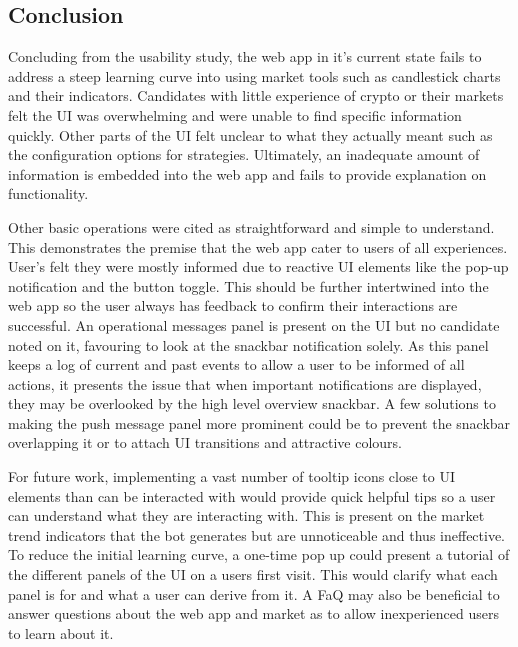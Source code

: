 \subsection{Conclusion}
\label{sec:evaluation:ui:conclusion}
\noindent Concluding from the usability study, the web app in it's current state fails to address a steep learning curve into using market tools such as candlestick charts and their indicators. Candidates with little experience of crypto or their markets felt the UI was overwhelming and were unable to find specific information quickly. Other parts of the UI felt unclear to what they actually meant such as the configuration options for strategies. Ultimately, an inadequate amount of information is embedded into the web app and fails to provide explanation on functionality.   

Other basic operations were cited as straightforward and simple to understand. This demonstrates the premise that the web app cater to users of all experiences. User's felt they were mostly informed due to reactive UI elements like the pop-up notification and the button toggle. This should be further intertwined into the web app so the user always has feedback to confirm their interactions are successful. An operational messages panel is present on the UI but no candidate noted on it, favouring to look at the snackbar notification solely. As this panel keeps a log of current and past events to allow a user to be informed of all actions, it presents the issue that when important notifications are displayed, they may be overlooked by the high level overview snackbar. A few solutions to making the push message panel more prominent could be to prevent the snackbar overlapping it or to attach UI transitions and attractive colours.   

For future work, implementing a vast number of tooltip icons close to UI elements than can be interacted with would provide quick helpful tips so a user can understand what they are interacting with. This is present on the market trend indicators that the bot generates but are unnoticeable and thus ineffective. To reduce the initial learning curve, a one-time pop up could present a tutorial of the different panels of the UI on a users first visit. This would clarify what each panel is for and what a user can derive from it. A FaQ may also be beneficial to answer questions about the web app and market as to allow inexperienced users to learn about it.














